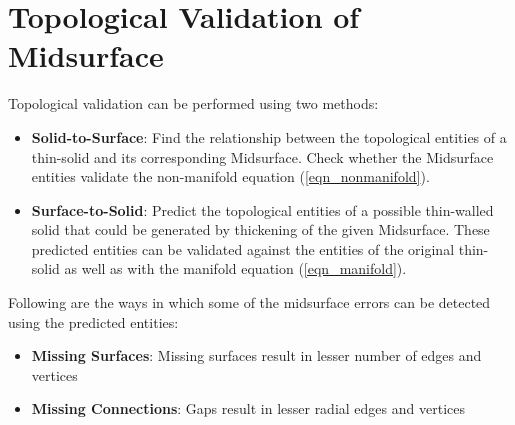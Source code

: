 \section{Topological Validation of Midsurface}

Topological validation can be performed using two methods:
\begin{itemize}
[noitemsep,topsep=2pt,parsep=2pt,partopsep=2pt]
\item \textbf{Solid-to-Surface}: Find the relationship between the topological entities of a thin-solid and its corresponding Midsurface. Check whether the  Midsurface entities validate the non-manifold equation (\ref{eqn_nonmanifold}).
\item  \textbf{Surface-to-Solid}: Predict the topological entities of a possible thin-walled solid that could be generated by thickening of the given Midsurface.  These predicted entities can be validated against the entities of the original thin-solid as well as with the manifold equation (\ref{eqn_manifold}).
\end{itemize}

Following are the ways in which some of the midsurface errors can be detected using the predicted entities:
\begin{itemize}
[noitemsep,topsep=2pt,parsep=2pt,partopsep=2pt]
\item \textbf{Missing Surfaces}: Missing surfaces result in lesser number of edges and vertices
\item \textbf{Missing Connections}: Gaps result in lesser radial edges and vertices 
\end{itemize}


